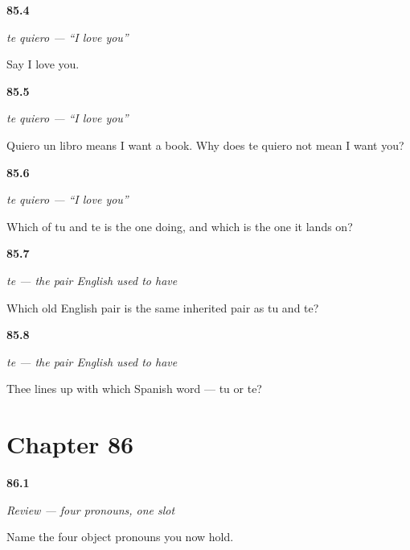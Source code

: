 \noindent\begin{minipage}[t]{\linewidth}
\raggedright
\hypertarget{review-ES-C42-te-say}{\textbf{85.4}} \emph{te quiero — \textquotedblleft{}I love you\textquotedblright{}}\par
\small Say I love you.
\end{minipage}\par\medskip

\noindent\begin{minipage}[t]{\linewidth}
\raggedright
\hypertarget{review-ES-C42-te-meaning}{\textbf{85.5}} \emph{te quiero — \textquotedblleft{}I love you\textquotedblright{}}\par
\small Quiero un libro means I want a book. Why does te quiero not mean I want you?
\end{minipage}\par\medskip

\noindent\begin{minipage}[t]{\linewidth}
\raggedright
\hypertarget{review-ES-C42-te-doer}{\textbf{85.6}} \emph{te quiero — \textquotedblleft{}I love you\textquotedblright{}}\par
\small Which of tu and te is the one doing, and which is the one it lands on?
\end{minipage}\par\medskip

\noindent\begin{minipage}[t]{\linewidth}
\raggedright
\hypertarget{review-ES-C42-te-thee-pair}{\textbf{85.7}} \emph{te — the pair English used to have}\par
\small Which old English pair is the same inherited pair as tu and te?
\end{minipage}\par\medskip

\noindent\begin{minipage}[t]{\linewidth}
\raggedright
\hypertarget{review-ES-C42-te-thee-which}{\textbf{85.8}} \emph{te — the pair English used to have}\par
\small Thee lines up with which Spanish word — tu or te?
\end{minipage}\par\medskip

\section*{Chapter 86}

\noindent\begin{minipage}[t]{\linewidth}
\raggedright
\hypertarget{review-ES-C42-repaso-objeto-four}{\textbf{86.1}} \emph{Review — four pronouns, one slot}\par
\small Name the four object pronouns you now hold.
\end{minipage}\par\medskip

